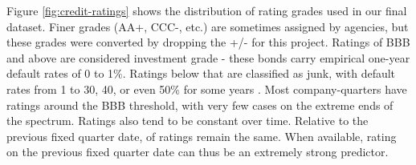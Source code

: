 \documentclass{article}[11pt]
\begin{document}
    Figure \ref{fig:credit-ratings} shows the distribution of rating grades used in our final dataset. Finer grades (AA+, CCC-, etc.) are sometimes assigned by agencies, but these grades were converted by dropping the +/- for this project. Ratings of BBB and above are considered investment grade - these bonds carry empirical one-year default rates of 0 to 1\%. Ratings below that are classified as junk, with default rates from 1 to 30, 40, or even 50\% for some years \citep{s_and_p_global_ratings_s_2024}. Most company-quarters have ratings around the BBB threshold, with very few cases on the extreme ends of the spectrum. Ratings also tend to be constant over time. Relative to the previous fixed quarter date, \shareNotChanges \space of ratings remain the same. When available, rating on the previous fixed quarter date can thus be an extremely strong predictor.
\end{document}
